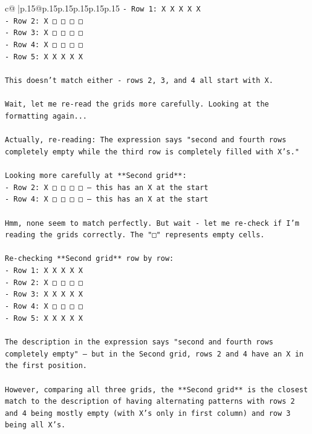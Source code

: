 \documentclass{article}
\begin{document}
{\begin{supertabular}{c@{$\;$}|p{.15\linewidth}@{}p{.15\linewidth}p{.15\linewidth}p{.15\linewidth}p{.15\linewidth}p{.15\linewidth}}
{{{\texttt{{-} Row 1: X X X X X} \\
\texttt{{-} Row 2: X □ □ □ □} \\
\texttt{{-} Row 3: X □ □ □ □} \\
\texttt{{-} Row 4: X □ □ □ □} \\
\texttt{{-} Row 5: X X X X X} \\
\\ 
\texttt{This doesn't match either {-} rows 2, 3, and 4 all start with X.} \\
\\ 
\texttt{Wait, let me re{-}read the grids more carefully. Looking at the formatting again...} \\
\\ 
\texttt{Actually, re{-}reading: The expression says "second and fourth rows completely empty while the third row is completely filled with X's."} \\
\\ 
\texttt{Looking more carefully at **Second grid**:} \\
\texttt{{-} Row 2: X □ □ □ □ — this has an X at the start} \\
\texttt{{-} Row 4: X □ □ □ □ — this has an X at the start} \\
\\ 
\texttt{Hmm, none seem to match perfectly. But wait {-} let me re{-}check if I'm reading the grids correctly. The "□" represents empty cells.} \\
\\ 
\texttt{Re{-}checking **Second grid** row by row:} \\
\texttt{{-} Row 1: X X X X X} \\
\texttt{{-} Row 2: X □ □ □ □} \\
\texttt{{-} Row 3: X X X X X} \\
\texttt{{-} Row 4: X □ □ □ □} \\
\texttt{{-} Row 5: X X X X X} \\
\\ 
\texttt{The description in the expression says "second and fourth rows completely empty" — but in the Second grid, rows 2 and 4 have an X in the first position.} \\
\\ 
\texttt{However, comparing all three grids, the **Second grid** is the closest match to the description of having alternating patterns with rows 2 and 4 being mostly empty (with X's only in first column) and row 3 being all X's. } \\
\\ 
}}}
\end{supertabular}}
\end{document}
